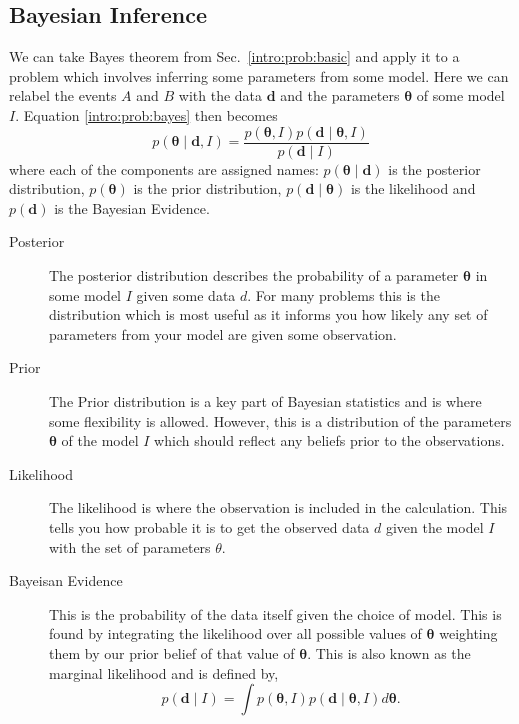 \subsection{\label{intro:prob:bayes}Bayesian Inference}

We can take Bayes theorem from Sec.~\ref{intro:prob:basic} and apply it to a
problem which involves inferring some parameters from some model. Here we can
relabel the events $A$ and $B$ with the data ${\bm d}$ and the parameters ${\bm
\theta}$ of some model $I$.  Equation \ref{intro:prob:bayes} then becomes
%
\begin{equation}
\label{intro:bayes:bayes}
p({\bm \theta} \mid {\bm d}, I) = \frac{p({\bm \theta}, I)p({\bm d} \mid {\bm \theta}, I)}{p({\bm d} \mid I)}
\end{equation}
%
where each of the components are assigned names: $p({\bm \theta} \mid {\bm d})$
is the posterior distribution, $p({\bm \theta})$ is the prior distribution,
$p({\bm d} \mid {\bm \theta})$ is the likelihood and $p({\bm d})$ is the
Bayesian Evidence.

\begin{description}
	\item [Posterior]
        The posterior distribution describes the probability of a parameter
${\bm \theta}$ in some model $I$ given some data $d$. For many problems this is
the distribution which is most useful as it informs you how likely any set of
parameters from your model are given some observation.
	
        \item [Prior] The Prior distribution is a key part of Bayesian
statistics and is where some flexibility is allowed. However, this is a distribution of the parameters ${\bm \theta}$ of the model $I$ which should reflect any beliefs prior to the observations.
	
        \item [Likelihood] The likelihood is where the observation is included
in the calculation. This tells you how probable it is to get the observed data
$d$ given the model $I$ with the set of parameters $\theta$. 
	
        \item [Bayeisan Evidence] This is the probability of the data itself
given the choice of model. This is found by integrating the likelihood over all
possible values of ${\bm \theta}$ weighting them by our prior belief of that
value of ${\bm \theta}$. This is also known as the marginal
likelihood and is defined by,
        \begin{equation} \label{intro:bayes:evidence} 
            p({\bm d} \mid I) = \int p({\bm \theta}, I)p({\bm d} \mid {\bm \theta}, I) d{\bm \theta}.
        \end{equation} 
\end{description}

